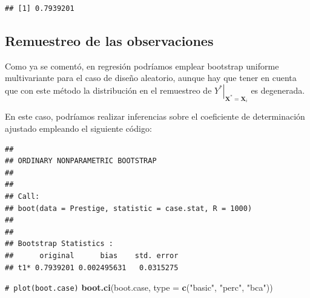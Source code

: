 \documentclass[
]{book}
\newenvironment{Shaded}{\begin{snugshade}}{\end{snugshade}}
\newcommand{\AttributeTok}[1]{\textcolor[rgb]{0.13,0.29,0.53}{#1}}
\newcommand{\CommentTok}[1]{\textcolor[rgb]{0.56,0.35,0.01}{\textit{#1}}}
\newcommand{\ControlFlowTok}[1]{\textcolor[rgb]{0.13,0.29,0.53}{\textbf{#1}}}
\newcommand{\DecValTok}[1]{\textcolor[rgb]{0.00,0.00,0.81}{#1}}
\newcommand{\FunctionTok}[1]{\textcolor[rgb]{0.13,0.29,0.53}{\textbf{#1}}}
\newcommand{\NormalTok}[1]{#1}
\newcommand{\OtherTok}[1]{\textcolor[rgb]{0.56,0.35,0.01}{#1}}
\newcommand{\SpecialCharTok}[1]{\textcolor[rgb]{0.81,0.36,0.00}{\textbf{#1}}}
\newcommand{\StringTok}[1]{\textcolor[rgb]{0.31,0.60,0.02}{#1}}
\renewcommand{\mathbf}[1]{\symbf{#1}}
\theoremstyle{break}
\theoremstyle{nonumberplain}
\renewcommand{\CommentTok}[1]{\textcolor[rgb]{0.41,0.41,0.41}{\texttt{#1}}}
\begin{document}
\begin{verbatim}
## [1] 0.7939201
\end{verbatim}

\subsection{Remuestreo de las observaciones}\label{boot-unif-reg}

Como ya se comentó, en regresión podríamos emplear bootstrap uniforme multivariante para el caso de diseño aleatorio, aunque hay que tener en cuenta que con este método la distribución en el remuestreo de \(\left. Y^{\ast}\right\vert _{\mathbf{X}^{\ast}=\mathbf{X}_i}\) es degenerada.

En este caso, podríamos realizar inferencias sobre el coeficiente de determinación ajustado empleando el siguiente código:

\begin{Shaded}
\end{Shaded}

\begin{verbatim}
## 
## ORDINARY NONPARAMETRIC BOOTSTRAP
## 
## 
## Call:
## boot(data = Prestige, statistic = case.stat, R = 1000)
## 
## 
## Bootstrap Statistics :
##      original      bias    std. error
## t1* 0.7939201 0.002495631   0.0315275
\end{verbatim}

\begin{Shaded}
\begin{Highlighting}[]
\CommentTok{\# plot(boot.case)}
\FunctionTok{boot.ci}\NormalTok{(boot.case, }\AttributeTok{type =} \FunctionTok{c}\NormalTok{(}\StringTok{"basic"}\NormalTok{, }\StringTok{"perc"}\NormalTok{, }\StringTok{"bca"}\NormalTok{))}
\end{Highlighting}
\end{Shaded}
\end{document}
